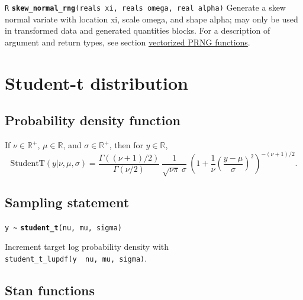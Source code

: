 \documentclass[
  10pt,
]{book}
\begin{document}

\texttt{R} \textbf{\texttt{skew\_normal\_rng}}\texttt{(reals\ xi,\ reals\ omega,\ real\ alpha)}\newline
Generate a skew normal variate with location xi, scale omega, and
shape alpha; may only be used in transformed data and generated quantities blocks.
For a description of argument and return types, see section
\protect\hyperlink{prng-vectorization}{vectorized PRNG functions}.

\hypertarget{student-t-distribution}{%
\section{Student-t distribution}\label{student-t-distribution}}

\hypertarget{probability-density-function-3}{%
\subsection{Probability density function}\label{probability-density-function-3}}

If \(\nu \in \mathbb{R}^+\), \(\mu \in \mathbb{R}\), and \(\sigma \in \mathbb{R}^+\), then for \(y \in \mathbb{R}\), \[
\text{StudentT}(y|\nu,\mu,\sigma) = \frac{\Gamma\left((\nu +
1)/2\right)}      {\Gamma(\nu/2)} \ \frac{1}{\sqrt{\nu \pi} \ \sigma}
\ \left( 1 + \frac{1}{\nu} \left(\frac{y - \mu}{\sigma}\right)^2
\right)^{-(\nu + 1)/2} \! . \]

\hypertarget{sampling-statement-27}{%
\subsection{Sampling statement}\label{sampling-statement-27}}

\texttt{y\ \textasciitilde{}} \textbf{\texttt{student\_t}}\texttt{(nu,\ mu,\ sigma)}

Increment target log probability density with \texttt{student\_t\_lupdf(y\ \textbar{}\ nu,\ mu,\ sigma)}.

\hypertarget{stan-functions-26}{%
\subsection{Stan functions}\label{stan-functions-26}}

\end{document}

